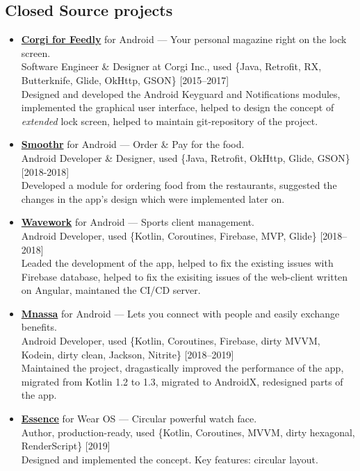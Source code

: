 \documentclass[a4paper]{article}
\begin{document}
	\subsection*{Closed Source projects}
	\begin{itemize}
		\item \href{http://getcorgi.com/}{\textbf{Corgi for Feedly}} for Android --- Your personal magazine right on the lock screen. \\[0.2em]
		{\footnotesize Software Engineer \& Designer at Corgi Inc., used \{Java, Retrofit, RX, Butterknife, Glide, OkHttp, GSON\} \hfill [2015--2017]} \\[0.2em]
		Designed and developed the Android Keyguard and Notifications modules, implemented the graphical user interface, helped to design the concept of \textit{extended} lock screen, helped to maintain git-repository of the project.

		\item \href{https://play.google.com/store/apps/details?id=de.sterlix.smoothr}{\textbf{Smoothr}} for Android --- Order \& Pay for the food. \\[0.2em]
		{\footnotesize Android Developer \& Designer, used \{Java, Retrofit, OkHttp, Glide, GSON\} \hfill [2018-2018]} \\[0.2em]
		Developed a module for ordering food from the restaurants, suggested the changes in the app's design which were implemented later on. 
		
		\item \href{https://wavework.com/}{\textbf{Wavework}} for Android --- Sports client management. \\[0.2em]
		{\footnotesize Android Developer, used \{Kotlin, Coroutines, Firebase, MVP, Glide\} \hfill [2018--2018]} \\[0.2em]
		Leaded the development of the app, helped to fix the existing issues with Firebase database, helped to fix the exisiting issues of the web-client written on Angular, maintaned the CI/CD server.
		
		\item \href{https://play.google.com/store/apps/details?id=com.mnassa}{\textbf{Mnassa}} for Android --- Lets you connect with people and easily exchange benefits. \\[0.2em]
		{\footnotesize Android Developer, used \{Kotlin, Coroutines, Firebase, dirty MVVM, Kodein, dirty clean, Jackson, Nitrite\} \hfill [2018--2019]} \\[0.2em]
		Maintained the project, dragastically improved the performance of the app, migrated from Kotlin 1.2 to 1.3, migrated to AndroidX, redesigned parts of the app.

		\item \href{https://play.google.com/store/apps/details?id=com.artemchep.essence}{\textbf{Essence}} for Wear OS --- Circular powerful watch face. \\[0.2em]
		{\footnotesize Author, production-ready, used \{Kotlin, Coroutines, MVVM, dirty hexagonal, RenderScript\} \hfill [2019]} \\[0.2em]
		Designed and implemented the concept. Key features: circular layout.   
	\end{itemize}
\end{document}
